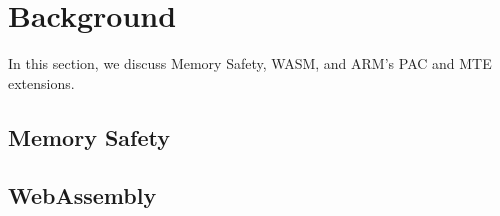 \chapter{Background}
\label{ch:background}

In this section, we discuss Memory Safety, \ac{WASM}, and ARM's \ac{PAC} and \ac{MTE} extensions.

\section{Memory Safety}
\label{sec:memory-safety}


\section{WebAssembly}
\label{sec:wasm}


